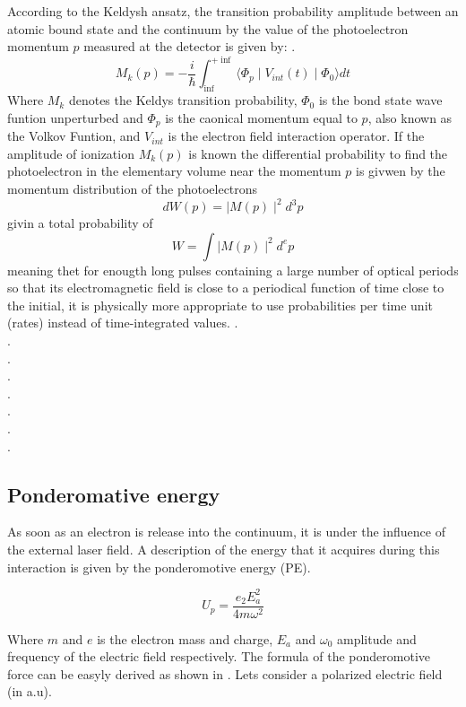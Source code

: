 According to the Keldysh ansatz, the transition probability amplitude between an atomic bound state and the continuum
 by the value of the photoelectron momentum $p$ measured at the detector is given by: \cite{popruzhenko_keldysh_2014}.
 \begin{equation}
 M_{k}(p) = -\dfrac{i}{\hbar} \int_{\inf}^{+\inf} \langle \Phi_{p}\mid  V_{int}(t)\mid \Phi_{0} \rangle dt
 \end{equation}
Where $M_{k}$ denotes the Keldys transition probability, $\Phi_{0}$ is the bond state wave funtion unperturbed and $\Phi_{p}$ is the caonical momentum equal to $p$, also known as the Volkov Funtion, and $V_{int}$ is the electron field interaction operator. 
If the amplitude of ionization $M_{k}(p)$ is known the differential
probability to find the photoelectron in the elementary volume near the momentum $p$ is givwen by the momentum distribution of the photoelectrons 
\begin{equation}
dW(p)=\mid M(p)\mid^{2} d^{3}p
\end{equation}
 givin a total probability of
 \begin{equation}
 W= \int \mid M(p)\mid^{2} d^{e}p
 \end{equation}
meaning thet for enougth long pulses containing a large number of optical
periods so that its electromagnetic field is close to a periodical function of time close to the initial, it is physically more appropriate to use probabilities per time unit (rates) instead of time-integrated values.
.\\.\\.\\.\\.\\.\\.\\.


\subsection{Ponderomative energy}


As soon as an electron is release into the continuum, it is  under the influence of the external laser field. A description of the energy that it acquires during this interaction is given by the ponderomotive energy (PE).

\begin{equation}
U_{p} = \dfrac{e_{2}E_{a}^{2}}{4m \omega^{2}}
\end{equation}

Where $m$ and $e$ is the electron mass and charge, $E_{a}$ and $\omega_{0}$  amplitude and frequency of the electric field respectively. The formula of the ponderomotive force can be easyly  derived as shown in \cite{protopapas_atomic_1997}\cite{connerade_highly_1998}. Lets consider a polarized electric field (in a.u).


